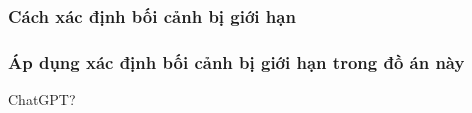 





\subsubsection{Cách xác định bối cảnh bị giới hạn}








\subsubsection{Áp dụng xác định bối cảnh bị giới hạn trong đồ án này}

ChatGPT?

